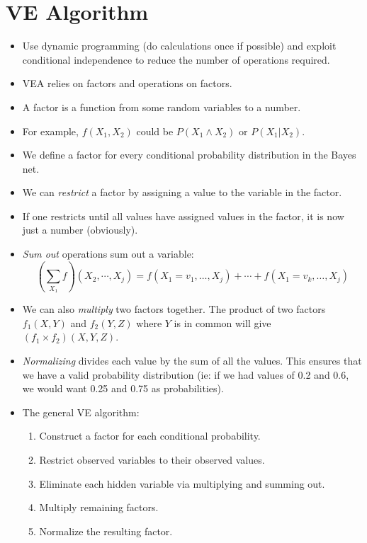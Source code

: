 \documentclass{article}
\begin{document}
\section{VE Algorithm}
\begin{itemize}
    \item Use dynamic programming (do calculations once if possible) and exploit conditional independence to reduce the number of operations required.
    \item VEA relies on factors and operations on factors.
    \item A factor is a function from some random variables to a number.
    \item For example, $f(X_1, X_2)$ could be $P(X_1 \wedge X_2)$ or $P(X_1 | X_2)$.
    \item We define a factor for every conditional probability distribution in the Bayes net.
    \item We can \emph{restrict} a factor by assigning a value to the variable in the factor.
    \item If one restricts until all values have assigned values in the factor, it is now just a number (obviously).
    \item \emph{Sum out} operations sum out a variable:
        \[
            (\sum_{X_1} f)(X_2,\cdots,X_j) = f(X_1 = v_1,\dots,X_j) + \cdots + f(X_1=v_k,\dots,X_j)
        \]
    \item We can also \emph{multiply} two factors together.  The product of two factors $f_1(X, Y)$ and $f_2(Y, Z)$ where $Y$ is in common will give $(f_1 \times f_2)(X, Y, Z)$.
    \item \emph{Normalizing} divides each value by the sum of all the values.  This ensures that we have a valid probability distribution (ie: if we had values of 0.2 and 0.6, we would want 0.25 and 0.75 as probabilities).
    \item The general VE algorithm:
        \begin{enumerate}
            \item Construct a factor for each conditional probability.
            \item Restrict observed variables to their observed values.
            \item Eliminate each hidden variable via multiplying and summing out.
            \item Multiply remaining factors.
            \item Normalize the resulting factor.
        \end{enumerate}
\end{itemize}
\end{document}
